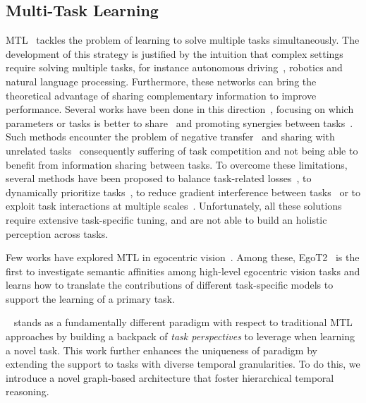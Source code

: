 \subsection{Multi-Task Learning}
MTL~\cite{caruana1997multitask, zhang2021survey} tackles the problem of learning to solve multiple tasks simultaneously.
The development of this strategy is justified by the intuition that complex settings require solving multiple tasks, for instance autonomous driving~\cite{Huang_2023_ICCV}, robotics and natural language processing.
Furthermore, these networks can bring the theoretical advantage of sharing complementary information to improve performance.
Several works have been done in this direction~\cite{kokkinos2017ubernet, huang2020mutual, fifty2021efficiently, chen2022unified, Chen_2023_ICCV, shi2023deep, Huang_2023_ICCV, ci2023unihcp}, focusing on which parameters or tasks is better to share~\cite{kang2011learning, guo2020learning, standley2020tasks, sun2020adashare} and promoting synergies between tasks~\cite{kapidis2019multitask, wang2021interactive}.
Such methods encounter the problem of negative transfer~\cite{kokkinos2017ubernet} and sharing with unrelated tasks~\cite{guo2020learning, standley2020tasks} consequently suffering of task competition and not being able to benefit from information sharing between tasks. To overcome these limitations, several methods have been proposed to balance task-related losses~\cite{kendall2018multi, chen2018gradnorm, sinha2018gradient}, to dynamically prioritize tasks~\cite{guo2018dynamic}, to reduce gradient interference between tasks~\cite{gradient_surgery} or to exploit task interactions at multiple scales~\cite{vandenhende2020mti}.
%
Unfortunately, all these solutions require extensive task-specific tuning, and are not able to build an holistic perception across tasks.

%
Few works have explored MTL in egocentric vision~\cite{kapidis2019multitask,egot2,huang2020mutual,egopack}.
Among these, EgoT2~\cite{egot2} is the first to investigate semantic affinities among high-level egocentric vision tasks and learns how to translate the contributions of different task-specific models to support the learning of a primary task.

\ourscvpr~\cite{egopack} stands as a fundamentally different paradigm with respect to traditional MTL approaches by building a backpack of \emph{task perspectives} to leverage when learning a novel task.
%
This work further enhances the uniqueness of \ourscvpr paradigm by extending the support to tasks with diverse temporal granularities. To do this, we introduce a novel graph-based architecture that foster hierarchical temporal reasoning.
